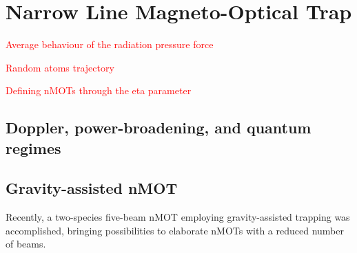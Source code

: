 %
\section{Narrow Line Magneto-Optical Trap}
%

\textcolor{red}{Average behaviour of the radiation pressure force}

\textcolor{red}{Random atoms trajectory}

\textcolor{red}{Defining nMOTs through the eta parameter}

\subsection{Doppler, power-broadening, and quantum regimes}

\subsection{Gravity-assisted nMOT}

Recently, a two-species five-beam nMOT \cite{ilzhofer2018two} employing gravity-assisted trapping was accomplished, bringing possibilities to elaborate nMOTs with a reduced number of beams.